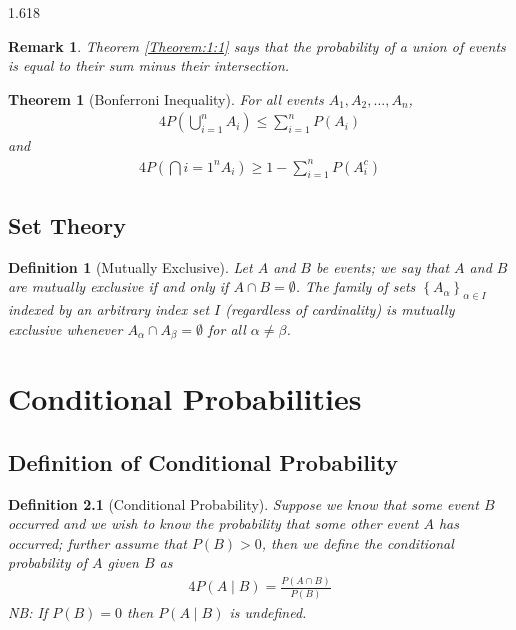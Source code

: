 \documentclass[11pt, oneside]{book}   	%
\newtheorem{definition}{Definition}[chapter]
\newtheorem{remark}{Remark}[chapter]
\newtheorem{theorem}{Theorem}[chapter]
\newcommand{\set}[1]{\left\{#1\right\}}
\begin{document}
\begin{spacing}{1.618}
		\begin{remark}
			Theorem \ref{Theorem:1:1} says that the probability of a union of events is equal to their sum minus their intersection. 
		\end{remark}
		
		\begin{theorem}[Bonferroni Inequality]
			For all events $A_1, A_2, \dots, A_n$, 
			\begin{alignat}{4}
				P\left(\bigcup_{i=1}^n A_i\right) \leq \sum_{i=1}^nP(A_i)
			\end{alignat}
			and
			\begin{alignat}{4}
				P\left(\bigcap{i=1}^n A_i\right) \geq 1-\sum_{i=1}^nP(A_i^c)
			\end{alignat}
		\end{theorem}
		
	\section{Set Theory}
	
		\begin{definition}[Mutually Exclusive]
			Let $A$ and $B$ be events; we say that $A$ and $B$ are \emph{mutually exclusive} if and only if $A\cap B=\emptyset$. The family of sets $\set{A_\alpha}_{\alpha \in I}$ indexed by an arbitrary index set $I$ (regardless of cardinality) is mutually exclusive whenever $A_\alpha \cap A_\beta = \emptyset$ for all $\alpha \neq \beta$.  
		\end{definition}
		
\chapter{Conditional Probabilities}
	\section{Definition of Conditional Probability}
	
		\begin{definition}[Conditional Probability]
			Suppose we know that some event $B$ occurred and we wish to know the probability that some other event $A$ has occurred; further assume that $P(B)>0$, then we define the \emph{conditional probability} of $A$ given $B$ as 
			\begin{alignat}{4}
				P(A\mid B) = \frac{P(A\cap B)}{P(B)}
			\end{alignat}
			NB: If $P(B)=0$ then $P(A\mid B)$ is undefined. 
		\end{definition}
		

\end{spacing}
\end{document}

